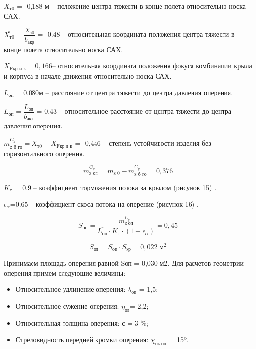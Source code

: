 $X_\text{т0}$ = -0,188 м – положение центра тяжести в конце полета относительно носка САХ.

$\overline{X_\text{т0}} = \dfrac{X_\text{т0}}{b_\text{акр}} $ = -0.48 – относительная координата положения центра тяжести в конце полета относительно носка САХ.

$\overline{ X_\text{Fкр и к} } = 0,166 $– относительная координата положения фокуса комбинации крыла и корпуса в начале движения относительно носка САХ.

$L_\text{оп}=0.080 $м – расстояние от центра тяжести до центра давления оперения.

$\overline{L_\text{оп}} = \dfrac{L_\text{оп}}{b_\text{акр}} $ = 0,43 – относительное расстояние от центра тяжести до центра давления оперения.

$m_\text{z б го}^{C_y} = \overline{X_\text{т0}} - \overline{X_\text{Fкр и к} } $ = -0,446 – степень устойчивости изделия без горизонтального оперения.

$$m_\text{z оп}^{C_y}=m_\text{z 0} - m_\text{z б го} ^{C_y} =0,376$$

$K_\text{т}$ = 0.9 – коэффициент торможения потока за крылом (рисунок 15) \cite{Astakhova}.

$\epsilon_\alpha $=0.65 – коэффициент скоса потока на оперение (рисунок 16) \cite{Astakhova}.

$$\overline{S_\text{оп}} = \dfrac{ m_\text{z оп}^{C_y} } { \overline{L_\text{оп}} \cdot K_\text{т} \cdot ( 1-\epsilon_\alpha) } =0,45$$

$$S_\text{оп}= \overline{S_\text{оп}} \cdot S_\text{кр}  = 0,022 \text{ м}^2$$


Принимаем площадь оперения равной Sоп = 0,030 м2. Для расчетов геометрии оперения примем следующие величины:
\begin{itemize}
 \item Относительное удлинение оперения:			$\lambda_\text{оп}$ = 1,5;
 \item Относительное сужение оперения:				$\eta_\text{оп} $= 2,2;
 \item Относительная толщина оперения:				$\overline{с} $ = 3 \%;
 \item Стреловидность передней кромки оперения:		$\chi_\text{пк оп} $ = 15º.
\end{itemize}

